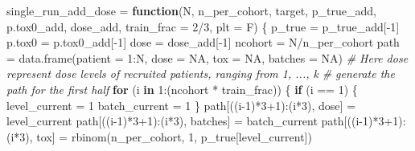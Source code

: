 \documentclass[
]{article}
\newenvironment{Shaded}{\begin{snugshade}}{\end{snugshade}}
\newcommand{\AttributeTok}[1]{\textcolor[rgb]{0.77,0.63,0.00}{#1}}
\newcommand{\CommentTok}[1]{\textcolor[rgb]{0.56,0.35,0.01}{\textit{#1}}}
\newcommand{\ConstantTok}[1]{\textcolor[rgb]{0.00,0.00,0.00}{#1}}
\newcommand{\ControlFlowTok}[1]{\textcolor[rgb]{0.13,0.29,0.53}{\textbf{#1}}}
\newcommand{\DecValTok}[1]{\textcolor[rgb]{0.00,0.00,0.81}{#1}}
\newcommand{\FunctionTok}[1]{\textcolor[rgb]{0.00,0.00,0.00}{#1}}
\newcommand{\NormalTok}[1]{#1}
\newcommand{\OtherTok}[1]{\textcolor[rgb]{0.56,0.35,0.01}{#1}}
\newcommand{\SpecialCharTok}[1]{\textcolor[rgb]{0.00,0.00,0.00}{#1}}
\newcommand{\StringTok}[1]{\textcolor[rgb]{0.31,0.60,0.02}{#1}}
\begin{document}
\begin{Shaded}
\begin{Highlighting}[]
\NormalTok{single\_run\_add\_dose }\OtherTok{=} \ControlFlowTok{function}\NormalTok{(N, n\_per\_cohort, target, p\_true\_add, p.tox0\_add, dose\_add, }\AttributeTok{train\_frac =} \DecValTok{2}\SpecialCharTok{/}\DecValTok{3}\NormalTok{, }\AttributeTok{plt =}\NormalTok{ F) \{}
\NormalTok{p\_true }\OtherTok{=}\NormalTok{ p\_true\_add[}\SpecialCharTok{{-}}\DecValTok{1}\NormalTok{]}
\NormalTok{p.tox0 }\OtherTok{=}\NormalTok{ p.tox0\_add[}\SpecialCharTok{{-}}\DecValTok{1}\NormalTok{]}
\NormalTok{dose }\OtherTok{=}\NormalTok{ dose\_add[}\SpecialCharTok{{-}}\DecValTok{1}\NormalTok{]}
\NormalTok{ncohort }\OtherTok{=}\NormalTok{ N}\SpecialCharTok{/}\NormalTok{n\_per\_cohort}
\NormalTok{path }\OtherTok{=} \FunctionTok{data.frame}\NormalTok{(}\AttributeTok{patient =} \DecValTok{1}\SpecialCharTok{:}\NormalTok{N, }\AttributeTok{dose =} \ConstantTok{NA}\NormalTok{, }\AttributeTok{tox =} \ConstantTok{NA}\NormalTok{, }\AttributeTok{batches =} \ConstantTok{NA}\NormalTok{)}
\CommentTok{\# Here dose represent dose levels of recruited patients, ranging from 1, ..., k}
\CommentTok{\# generate the path for the first half}
\ControlFlowTok{for}\NormalTok{ (i }\ControlFlowTok{in} \DecValTok{1}\SpecialCharTok{:}\NormalTok{(ncohort }\SpecialCharTok{*}\NormalTok{ train\_frac)) \{}
\ControlFlowTok{if}\NormalTok{ (i }\SpecialCharTok{==} \DecValTok{1}\NormalTok{) \{}
\NormalTok{level\_current }\OtherTok{=} \DecValTok{1}
\NormalTok{batch\_current }\OtherTok{=} \DecValTok{1}
\NormalTok{\}}
\NormalTok{path[((i}\DecValTok{{-}1}\NormalTok{)}\SpecialCharTok{*}\DecValTok{3}\SpecialCharTok{+}\DecValTok{1}\NormalTok{)}\SpecialCharTok{:}\NormalTok{(i}\SpecialCharTok{*}\DecValTok{3}\NormalTok{), }\StringTok{\textquotesingle{}dose\textquotesingle{}}\NormalTok{]  }\OtherTok{=}\NormalTok{ level\_current}
\NormalTok{path[((i}\DecValTok{{-}1}\NormalTok{)}\SpecialCharTok{*}\DecValTok{3}\SpecialCharTok{+}\DecValTok{1}\NormalTok{)}\SpecialCharTok{:}\NormalTok{(i}\SpecialCharTok{*}\DecValTok{3}\NormalTok{), }\StringTok{\textquotesingle{}batches\textquotesingle{}}\NormalTok{] }\OtherTok{=}\NormalTok{ batch\_current}
\NormalTok{path[((i}\DecValTok{{-}1}\NormalTok{)}\SpecialCharTok{*}\DecValTok{3}\SpecialCharTok{+}\DecValTok{1}\NormalTok{)}\SpecialCharTok{:}\NormalTok{(i}\SpecialCharTok{*}\DecValTok{3}\NormalTok{), }\StringTok{\textquotesingle{}tox\textquotesingle{}}\NormalTok{] }\OtherTok{=} \FunctionTok{rbinom}\NormalTok{(n\_per\_cohort, }\DecValTok{1}\NormalTok{, p\_true[level\_current])}

\end{Highlighting}
\end{Shaded}
\end{document}
